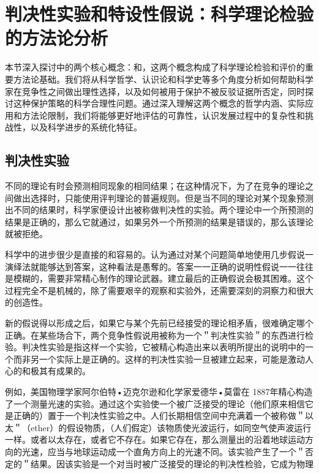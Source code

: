 \section{判决性实验和特设性假说：科学理论检验的方法论分析}

\begin{logicbox}[title=引言]
本节深入探讨中的两个核心概念：和，这两个概念构成了科学理论检验和评价的重要方法论基础。我们将从科学哲学、认识论和科学史等多个角度分析如何帮助科学家在竞争性之间做出理性选择，以及如何被用于保护不被反驳证据所否定，同时探讨这种保护策略的科学合理性问题。通过深入理解这两个概念的哲学内涵、实际应用和方法论限制，我们将能够更好地评估的可靠性，认识发展过程中的复杂性和挑战性，以及科学进步的系统化特征。
\end{logicbox}

\subsection{判决性实验}
不同的理论有时会预测相同现象的相同结果；在这种情况下，为了在竞争的理论之间做出选择时，只能使用评判理论的普遍规则。但是当不同的理论对某个现象预测出不同的结果时，科学家便设计出被称做判决性的实验。两个理论中一个所预测的结果是正确的，那么它就通过，如果另外一个所预测的结果是错误的，那么该理论就被拒绝。

科学中的进步很少是直接的和容易的。认为通过对某个问题简单地使用几步假说一演绎法就能够达到答案，这种看法是愚奪的。答案一一正确的说明性假说一一往往是模糊的，需要非常精心制作的理论武器。建立最后的正确假说会极其困难。这个过程完全不是机械的，除了需要艰辛的观察和实验外，还需要深刻的洞察力和很大的创造性。

新的假说得以形成之后，如果它与某个先前已经接受的理论相矛盾，很难确定哪个正确。在某些场合下，两个竞争性假说用被称为一个＂判决性实验＂的东西进行检验。判决性实验是指这样一个实验，它被精心构造出来以表明所提出的说明中的一个而非另一个实际上是正确的。这样的判决性实验一旦被建立起来，可能是激动人心的和极其有成果的。

例如，美国物理学家阿尔伯特•迈克尔逊和化学家爱德华•莫雷在 1887年精心构造了一个测量光速的实验。通过这个实验使一个被广泛接受的理论（他们原来相信它是正确的）置于一个判决性实验之中。人们长期相信空间中充满着一个被称做＂以太＂（ether）的假设物质，（人们假定）该物质使光波运行，如同空气使声波运行一样。或者以太存在，或者它不存在。如果它存在，那么测量出的沿着地球运动方向的光速，应当与地球运动成一个直角方向上的光速不同。该实验产生了一个＂否定的＂结果。因该实验是一个对当时被广泛接受的理论的判决性检验，它成为物理

